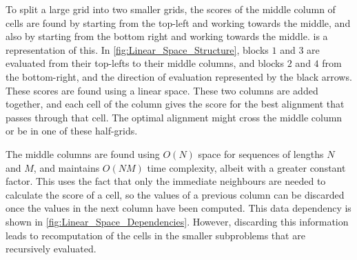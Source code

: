 To split a large grid into two smaller grids, the scores of the middle column of cells are found by starting from the top-left and working towards the middle, and also by starting from the bottom right and working towards the middle.
 is a representation of this.
In \cref{fig:Linear_Space_Structure}, blocks $1$ and $3$ are evaluated from their top-lefts to their middle columns, and blocks $2$ and $4$ from the bottom-right, and the direction of evaluation represented by the black arrows.
These scores are found using a linear space.
These two columns are added together, and each cell of the column gives the score for the best alignment that passes through that cell.
The optimal alignment might cross the middle column or be in one of these half-grids.

The middle columns are found using $O(N)$ space for sequences of lengths $N$ and $M$, and maintains $O(NM)$ time complexity, albeit with a greater constant factor.
This uses the fact that only the immediate neighbours are needed to calculate the score of a cell, so the values of a previous column can be discarded once the values in the next column have been computed. This data dependency is shown in \cref{fig:Linear_Space_Dependencies}.
However, discarding this information leads to recomputation of the cells in the smaller subproblems that are recursively evaluated.

